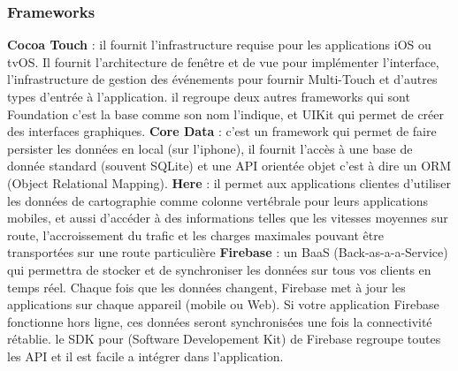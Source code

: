 \subsubsection{Frameworks} %
\label{ssub:subsubsection_name}
\begin{itemize}
	\itemb \textbf{Cocoa Touch} : il fournit l'infrastructure requise pour les applications iOS ou tvOS. Il fournit l'architecture de fenêtre et de vue pour implémenter l'interface, l'infrastructure de gestion des événements pour fournir Multi-Touch et d'autres types d'entrée à l'application.
	il regroupe deux autres frameworks qui sont Foundation c'est la base comme son nom l'indique, et UIKit
	qui permet de créer des interfaces graphiques.
	\itemb \textbf{Core Data} : c'est un framework qui permet de faire persister les données en local (sur l'iphone), il fournit l’accès à une base de donnée standard (souvent SQLite) et une API orientée objet c'est à dire un ORM (Object Relational Mapping).
	\itemb \textbf{Here} : il permet aux applications clientes d'utiliser les données de cartographie comme colonne vertébrale pour leurs applications mobiles, et aussi d'accéder à des informations telles que les vitesses moyennes sur route, l'accroissement du trafic et les charges maximales pouvant être transportées sur une route particulière
	\itemb \textbf{Firebase} : un BaaS (Back-as-a-a-Service) qui permettra de stocker et de synchroniser les données sur tous vos clients en temps réel. Chaque fois que les données changent, Firebase met à jour les applications sur chaque appareil (mobile ou Web). Si votre application Firebase fonctionne hors ligne, ces données seront synchronisées une fois la connectivité rétablie.\newline
	le SDK pour (Software Developement Kit) de Firebase regroupe toutes les API et il est facile a intégrer dans l'application.
\end{itemize}

